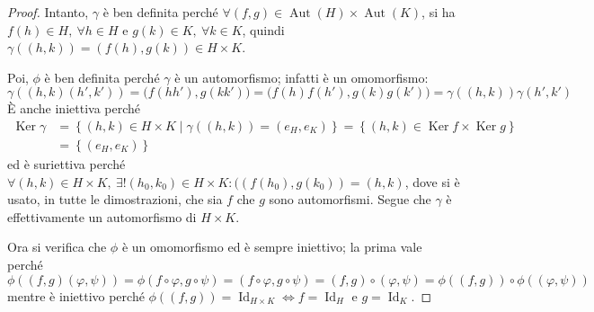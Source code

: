 \documentclass[11pt]{article}
\theoremstyle{style}
\numberwithin{equation}{subsection}
\begin{document}
	\begin{proof}
		Intanto, $\gamma$ \`e ben definita perch\'e $\forall (f , g) \in \operatorname{Aut} (H ) \times \operatorname{Aut}(K) $, si ha $f(h) \in H, \ \forall h \in H$ e $g(k) \in K, \ \forall k \in K$, quindi $\gamma((h,k)) = (f(h),g(k)) \in H \times  K$.
		
		Poi, $\phi $ \`e ben definita perch\'e $\gamma$ \`e un automorfismo; infatti \`e un omomorfismo:
		\[
		\gamma((h,k)(h',k'))=\big(f(hh'),g(kk')\big) = \big(f(h)f(h') , g(k) g(k')\big) =\gamma((h,k)) \gamma(h',k')
		\] 
		\`E anche iniettiva perch\'e 
\[
	\begin{split}
		\operatorname{Ker} \gamma &= \left\{ (h,k) \in H \times K  \mid \gamma((h,k)) = (e_H,e_K) \right\} = \left\{ (h,k) \in \operatorname{Ker} f \times \operatorname{Ker} g \right\} \\
					  &= \left\{ (e_H,e_K) \right\} 
	\end{split}
\] 
		ed \`e suriettiva perch\'e $\forall (h,k) \in H \times  K, \ \exists ! (h_0,k_0) \in H\times K : ((f(h_0),g(k_0)) = (h,k)$, dove si \`e usato, in tutte le dimostrazioni, che sia $f$ che $g$ sono automorfismi.
		Segue che $\gamma$ \`e effettivamente un automorfismo di $H \times K$.

Ora si verifica che $\phi $ \`e un omomorfismo ed \`e sempre iniettivo; la prima vale perch\'e 
\[
\phi ((f,g)(\varphi ,\psi )) = \phi (f\circ\varphi ,g\circ\psi ) = (f\circ\varphi , g \circ\psi )= (f,g)\circ(\varphi ,\psi )=\phi ((f,g))\circ \phi ((\varphi ,\psi ))
\] 
mentre \`e iniettivo perch\'e $\phi ((f,g))= \operatorname{Id} _{H\times K}  \iff f = \operatorname{Id} _H$ e $g = \operatorname{Id} _K$.


\end{proof}
\end{document}
